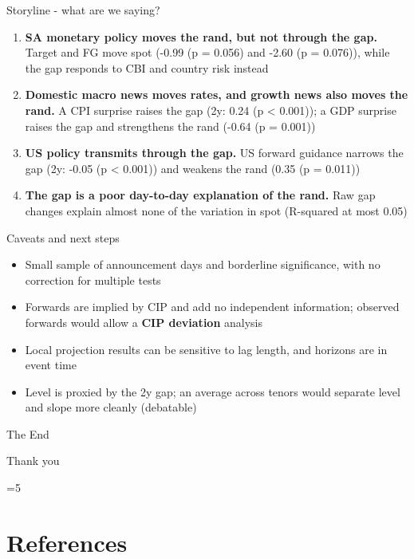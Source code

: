 \documentclass[
  ignorenonframetext,
  aspectratio=141,
]{beamer}
\providecommand{\tightlist}{%
  \setlength{\itemsep}{0pt}\setlength{\parskip}{0pt}}\usepackage{longtable,booktabs,array}
\let\oldsection\section
\renewcommand{\section}{\ifnum\value{section}=5 \appendix\fi\oldsection}
\begin{document}
\begin{frame}{Storyline - what are we saying?}
\label{storyline---what-are-we-saying}
\begin{enumerate}
\tightlist
\item
  \textbf{SA monetary policy moves the rand, but not through the gap.}
  Target and FG move spot (-0.99 (p = 0.056) and -2.60 (p = 0.076)),
  while the gap responds to CBI and country risk instead
\item
  \textbf{Domestic macro news moves rates, and growth news also moves
  the rand.} A CPI surprise raises the gap (2y: 0.24 (p \textless{}
  0.001)); a GDP surprise raises the gap and strengthens the rand (-0.64
  (p = 0.001))
\item
  \textbf{US policy transmits through the gap.} US forward guidance
  narrows the gap (2y: -0.05 (p \textless{} 0.001)) and weakens the rand
  (0.35 (p = 0.011))
\item
  \textbf{The gap is a poor day-to-day explanation of the rand.} Raw gap
  changes explain almost none of the variation in spot (R-squared at
  most 0.05)
\end{enumerate}
\end{frame}

\begin{frame}{Caveats and next steps}
\label{caveats-and-next-steps}
\begin{itemize}
\tightlist
\item
  Small sample of announcement days and borderline significance, with no
  correction for multiple tests
\item
  Forwards are implied by CIP and add no independent information;
  observed forwards would allow a \textbf{CIP deviation} analysis
\item
  Local projection results can be sensitive to lag length, and horizons
  are in event time
\item
  Level is proxied by the 2y gap; an average across tenors would
  separate level and slope more cleanly (debatable)
\end{itemize}
\end{frame}

\begin{frame}{The End}
\label{the-end}
\vfill
\begin{center}
\Huge Thank you
\end{center}
\vfill
\end{frame}

\section{References}\label{references}
\end{document}
